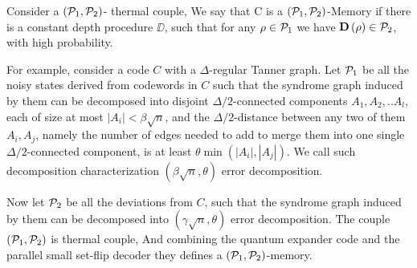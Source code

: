 \documentclass[manuscript,screen,review]{acmart}
\begin{document}
{ \begin{definition}[$(\Po,\Pt)$-Memory]
   Consider a $\left(\mathcal{P}_{1},\mathcal{P}_{2} \right)$- thermal couple, We say that C is a $(\Po, \Pt)$-Memory if there is a constant depth procedure $\DD$, such that for any $\rho \in \mathcal{P}_{1}$ we have $\mathbf{D}\left( \rho \right) \in \mathcal{P}_{2}$, with high probability. 
 \end{definition}
 For example, consider a code $C$ with a $\Delta$-regular Tanner graph. Let $\mathcal{P}_{1}$ be all the noisy states derived from codewords in $C$ such that the syndrome graph induced by them can be decomposed into disjoint $\Delta/2$-connected components $A_{1},A_{2},..A_{l}$, each of size at most $|A_{i}| < \beta \sqrt{n}$, and the $\Delta/2$-distance between any two of them $A_{i}, A_{j}$, namely the number of edges needed to add to merge them into one single $\Delta/2$-connected component, is at least $\theta \min \left( |A_{i}|, |A_{j}| \right)$. We call such decomposition characterization $(\beta \sqrt{n}, \theta )$ error decomposition. 

 Now let $\mathcal{P}_{2}$ be all the deviations from $C$, such that the syndrome graph induced by them can be decomposed into $\left(\gamma \sqrt{n}, \theta \right)$ error decomposition. The couple $\left( \mathcal{P}_{1}, \mathcal{P}_{2} \right)$ is thermal couple, And combining the quantum expander code and the parallel small set-flip decoder \cite{grospellier:tel-03364419} they defines a $\left( \mathcal{P}_{1}, \mathcal{P}_{2} \right)$-memory. 










  \newcommand{\sliceb}[1]{ \slice[style=blue, label style={inner sep=1pt,anchor=south west,rotate=40}]{#1}}

}
\end{document}
